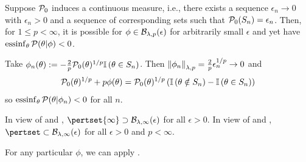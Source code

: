\begin{ex}
%
Suppose $\mathcal{P}_{0}$ induces a continuous measure, i.e., there exists a sequence
$\epsilon_n \rightarrow 0$ with $\epsilon_n > 0$ and a sequence of corresponding
sets such that $\mathcal{P}_{0}(S_n) = \epsilon_n$.  Then, for $1 \le p < \infty$, it is
possible for $\phi \in \mathcal{B}_{\lambda,p}(\epsilon)$ for arbitrarily small
$\epsilon$ and yet have $\operatorname*{\mathrm{essinf}}_{\theta} \mathcal{P}(\theta \vert \phi) < 0$.

Take
%
%
$\phi_n(\theta) := - \frac{2}{p} \mathcal{P}_{0}(\theta)^{1/p} \mathbb{I}\left(\theta \in S_n\right)$.
%
%
Then $\left\Vert\phi_n\right\Vert_{\lambda, p} = \frac{2}{p} \epsilon_n^{1/p} \rightarrow 0$
and
%
\begin{align*}
%
\pbase(\theta)^{1/p} + p \phi(\theta) ={}
\pbase(\theta)^{1/p}
\left(\ind{\theta \notin S_n} - \ind{\theta \in S_n} \right)
%
\end{align*}
%
so $\operatorname*{\mathrm{essinf}}_\theta \mathcal{P}(\theta \vert \phi_n) < 0$ for all $n$.
%
\end{ex}

In view of  and ,
$\pertset{\infty} \supset \ball_{\lambda,\infty}(\epsilon)$ for all $\epsilon >
0$. In view of  and , $\pertset
\subset \ball_{\lambda,\infty}(\epsilon)$ for all $\epsilon > 0$ and $p <
\infty$.



For any particular $\phi$, we can apply .
%

